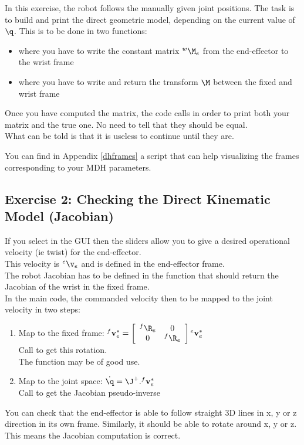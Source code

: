 \documentclass{ecnreport}
\begin{document}
  In this exercise, the robot follows the manually given joint positions. The task is to build and print the direct geometric model, depending on the current value of $\q$. This is to be done in two functions:
  \begin{itemize}
    \item {} where you have to write the constant matrix $\wMe$ from the end-effector to the wrist frame
    \item {}  where you have to write and return the transform $\M$ between the fixed and wrist frame
  \end{itemize}
  Once you have computed the  matrix, the code calls  in order to print both your matrix and the true one. No need to tell that they should be equal.\\
  What can be told is that it is useless to continue until they are.

  You can find in Appendix \ref{dhframes} a script that can help visualizing the frames corresponding to your MDH parameters.
  
  \subsection*{Exercise 2: Checking the Direct Kinematic Model (Jacobian)}
  
  If you select  in the GUI then the sliders allow you to give a desired operational velocity (ie twist) for the end-effector.\\
  This velocity is ${}^e\v_e$ and is defined in the end-effector frame.\\
  The robot Jacobian has to be defined in the function  that should return the Jacobian of the wrist in the fixed frame.\\
  
  
  In the main code, the commanded velocity then to be mapped to the joint velocity in two steps:
  \begin{enumerate}
    \item Map to the fixed frame: ${}^f\mathbf{v}_e^* = \left[\begin{array}{cc}{}^f\R_e & 0 \\ 0 & {}^f\R_e\end{array}\right]{}^e\mathbf{v}_e^*$\\
    Call  to get this rotation.\\
    The  function may be of good use.
    \item Map to the joint space: $\dot\q = \J^+.{}^f\mathbf{v}_e^*$\\
    Call  to get the Jacobian pseudo-inverse
  \end{enumerate}
  You can check that the end-effector is able to follow straight 3D lines in x, y or z direction in its own frame.
  Similarly, it should be able to rotate around x, y or z. This means the Jacobian computation is correct.
  
\end{document}
